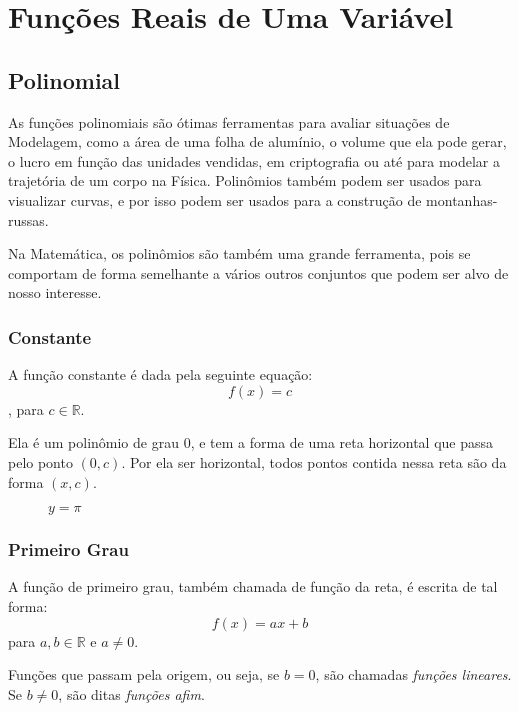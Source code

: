 \chapter{Funções Reais de Uma Variável}
\Blindtext %
\section{Polinomial}
As funções polinomiais são ótimas ferramentas para avaliar situações de Modelagem, como a área de uma folha de alumínio, o volume que ela pode gerar,  o lucro em função das unidades vendidas, em criptografia ou até para modelar a trajetória de um corpo na Física. Polinômios também podem ser usados para visualizar curvas, e por isso podem ser usados para a construção de montanhas-russas. \par 
Na Matemática, os polinômios são também uma grande ferramenta, pois se comportam de forma semelhante a vários outros conjuntos que podem ser alvo de nosso interesse.

\subsection{Constante}
A função constante é dada pela seguinte equação:
\[f(x)=c\], para $c \in \mathbb{R}$.\par
Ela é um polinômio de grau $0$, e tem a forma de uma reta horizontal que passa pelo ponto $(0,c)$. Por ela ser horizontal, todos pontos contida nessa reta são da forma $(x,c)$.
\begin{figure}[H] 
\centering
    \caption[Função Constante]{$y=\pi$}
\end{figure}

\subsection{Primeiro Grau}
A função de primeiro grau, também chamada de função da reta, é escrita de tal forma:
\[f(x)=ax+b\] para $a,b\in \mathbb{R}$ e $a \neq 0$.\par
Funções que passam pela origem, ou seja, se $b=0$, são chamadas \emph{funções lineares}. Se $b\neq 0$, são ditas \emph{funções afim}. \par
